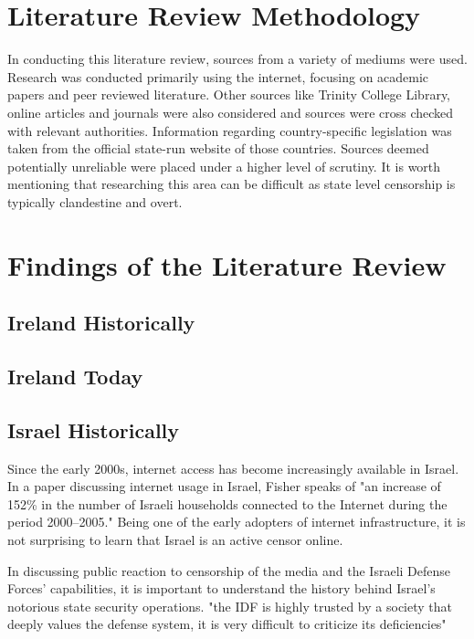\section{Literature Review Methodology}

In conducting this literature review, sources from a variety of mediums were used. Research was conducted primarily using the internet, focusing on academic papers and peer reviewed literature. Other sources like Trinity College Library, online articles and journals were also considered and sources were cross checked with relevant authorities. Information regarding country-specific legislation was taken from the official state-run website of those countries. Sources deemed potentially unreliable were placed under a higher level of scrutiny. It is worth mentioning that researching this area can be difficult as state level censorship is typically clandestine and overt. 



\section{Findings of the Literature Review}
\subsection{Ireland Historically }


\subsection{Ireland Today}





\subsection{Israel Historically}
Since the early 2000s, internet access has become increasingly available in Israel. In a paper discussing internet usage in Israel, Fisher speaks of "an increase of 152\% in the number of Israeli households connected to the Internet during the period 2000–2005." \cite{FISHER2006984} 
Being one of the early adopters of internet infrastructure, it is not surprising to learn that Israel is an active censor online. 

In discussing public reaction to censorship of the media and the Israeli Defense Forces' capabilities, it is important to understand the history behind Israel's notorious state security operations. 
"the IDF is highly trusted by a society that deeply values the defense system, it is very difficult to criticize its deficiencies" \cite{MAGEN2018287}

